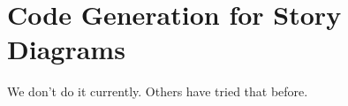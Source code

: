 

\section{Code Generation for Story Diagrams}
 We don't do it currently. Others have tried that before.\cite{GBD07}